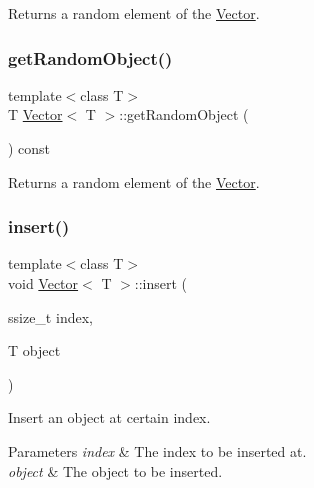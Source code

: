 Returns a random element of the \hyperlink{classVector}{Vector}. \mbox{\label{classVector_a1d3180f23d1c9cfcbd5d8c9414f08ac8}} 
\subsubsection{\texorpdfstring{get\+Random\+Object()}{getRandomObject()}\hspace{0.1cm}{\footnotesize\ttfamily [2/2]}}
{\footnotesize\ttfamily template$<$class T$>$ \\
T \hyperlink{classVector}{Vector}$<$ T $>$\+::get\+Random\+Object (\begin{DoxyParamCaption}{ }\end{DoxyParamCaption}) const\hspace{0.3cm}{\ttfamily [inline]}}

Returns a random element of the \hyperlink{classVector}{Vector}. \mbox{\label{classVector_af26422bc96ef24de9752fc17270084b3}} 
\subsubsection{\texorpdfstring{insert()}{insert()}\hspace{0.1cm}{\footnotesize\ttfamily [1/2]}}
{\footnotesize\ttfamily template$<$class T$>$ \\
void \hyperlink{classVector}{Vector}$<$ T $>$\+::insert (\begin{DoxyParamCaption}\item[{ssize\+\_\+t}]{index,  }\item[{T}]{object }\end{DoxyParamCaption})\hspace{0.3cm}{\ttfamily [inline]}}

Insert an object at certain index. 
\begin{DoxyParams}{Parameters}
{\em index} & The index to be inserted at. \\
\hline
{\em object} & The object to be inserted. \\
\hline
\end{DoxyParams}
\mbox{\label{classVector_af26422bc96ef24de9752fc17270084b3}} 
